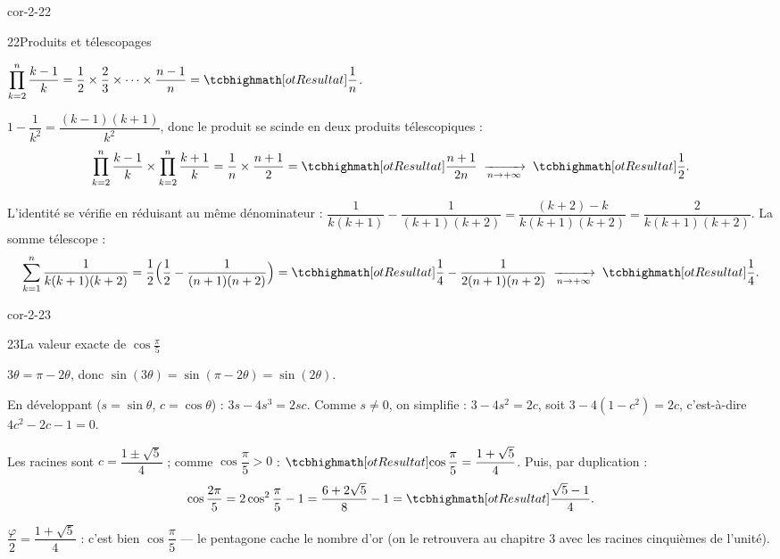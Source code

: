 \begin{blocLivre}{cor-2-22}
\begin{corrige}{22}{Produits et télescopages}
\begin{questions}
  \item $\displaystyle\prod_{k=2}^{n}\frac{k-1}{k}=\frac{1}{2}\times\frac{2}{3}\times\dots\times\frac{n-1}{n}
    =\res{\frac{1}{n}}$.
  \item $1-\dfrac{1}{k^{2}}=\dfrac{(k-1)(k+1)}{k^{2}}$, donc le produit se
    scinde en deux produits télescopiques :
    \[
      \prod_{k=2}^{n}\frac{k-1}{k}\times\prod_{k=2}^{n}\frac{k+1}{k}
      =\frac{1}{n}\times\frac{n+1}{2}=\res{\frac{n+1}{2n}}
      \;\xrightarrow[n\to+\infty]{}\;\res{\frac12}.
    \]
  \item L'identité se vérifie en réduisant au même dénominateur :
    $\dfrac{1}{k(k+1)}-\dfrac{1}{(k+1)(k+2)}=\dfrac{(k+2)-k}{k(k+1)(k+2)}
    =\dfrac{2}{k(k+1)(k+2)}$. La somme télescope :
    \[
      \sum_{k=1}^{n}\frac{1}{k(k+1)(k+2)}
      =\frac12\Bigl(\frac{1}{2}-\frac{1}{(n+1)(n+2)}\Bigr)
      =\res{\frac14-\frac{1}{2(n+1)(n+2)}}
      \;\xrightarrow[n\to+\infty]{}\;\res{\frac14}.
    \]
\end{questions}
\end{corrige}
\end{blocLivre}

\begin{blocLivre}{cor-2-23}
\begin{corrige}{23}{La valeur exacte de $\cos\frac{\pi}{5}$}
\begin{questions}
  \item $3\theta=\pi-2\theta$, donc $\sin(3\theta)=\sin(\pi-2\theta)=\sin(2\theta)$.
  \item En développant ($s=\sin\theta$, $c=\cos\theta$) :
    $3s-4s^{3}=2sc$. Comme $s\neq0$, on simplifie :
    $3-4s^{2}=2c$, soit $3-4(1-c^{2})=2c$, c'est-à-dire $4c^{2}-2c-1=0$.
  \item Les racines sont $c=\dfrac{1\pm\sqrt5}{4}$ ; comme
    $\cos\dfrac{\pi}{5}>0$ :
    $\res{\cos\dfrac{\pi}{5}=\dfrac{1+\sqrt5}{4}}$. Puis, par duplication :
    \[
      \cos\frac{2\pi}{5}=2\cos^{2}\frac{\pi}{5}-1
      =\frac{6+2\sqrt5}{8}-1=\res{\frac{\sqrt5-1}{4}}.
    \]
  \item $\dfrac{\varphi}{2}=\dfrac{1+\sqrt5}{4}$ : c'est bien
    $\cos\dfrac{\pi}{5}$ — le pentagone cache le nombre d'or (on le
    retrouvera au chapitre 3 avec les racines cinquièmes de l'unité).
\end{questions}
\end{corrige}
\end{blocLivre}

